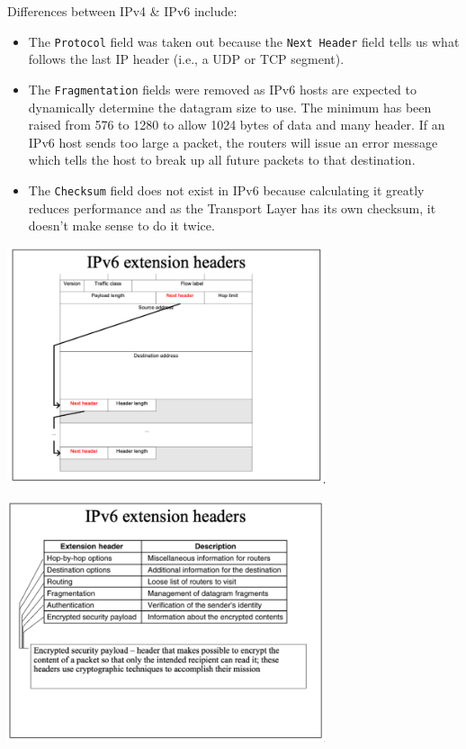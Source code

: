 \documentclass[11pt]{article}
\begin{document}
Differences between IPv4 \& IPv6 include:
\begin{itemize}
    \item   The \verb|Protocol| field was taken out because the \verb|Next Header| field tells us what follows the last IP header (i.e., a UDP or TCP segment).
    \item   The \verb|Fragmentation| fields were removed as IPv6 hosts are expected to dynamically determine the datagram size to use.
            The minimum has been raised from 576 to 1280 to allow 1024 bytes of data and many header.
            If an IPv6 host sends too large a packet, the routers will issue an error message which tells the host to break up all future packets to that destination.
    \item   The \verb|Checksum| field does not exist in IPv6 because calculating it greatly reduces performance and as the Transport Layer has its own checksum, it doesn't make sense to do it twice.
\end{itemize}


\begin{center}
    \includegraphics[width=0.7\textwidth]{ipv6extensionheaders.png}
\end{center}

\begin{center}
    \includegraphics[width=0.7\textwidth]{ipv6extensionheaders2.png}
\end{center}
\end{document}
